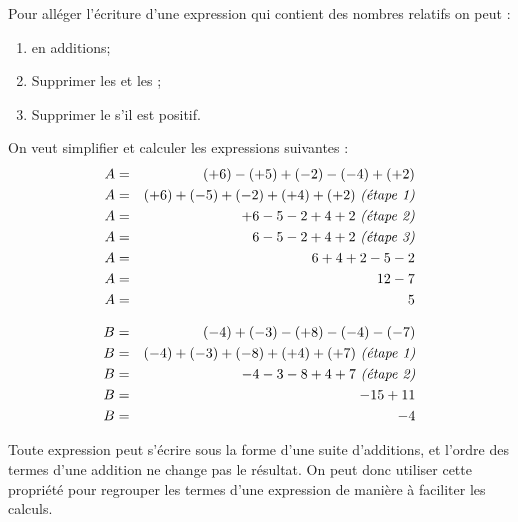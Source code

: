 \begin{mymeth}
	Pour alléger l'écriture d'une expression qui contient des nombres relatifs on peut :
	\begin{enumerate}
		\item {} en additions;
		\item Supprimer les  et les ;
		\item Supprimer le  s'il est positif.
	\end{enumerate}
\end{mymeth}

\begin{myexs}
	
	On veut simplifier et calculer les expressions suivantes :
	\begin{eqnarray*}
		A &=& (+6) - (+5) + (-2) - (-4) + (+2)\\
		A &=& (+6) + (-5) + (-2) + (+4) + (+2)  \text{  \textit{(étape 1)}} \\
		A &=& +6  -5  -2  +4  +2 \text{  \textit{(étape 2)}}\\
		A &=& 6  -5  -2  +4  +2 \text{  \textit{(étape 3)}}\\
		A &=& 6 + 4 + 2 - 5 - 2 \\
		A &=& 12 - 7 \\
		A &=& 5 \\
	\end{eqnarray*}


	\begin{eqnarray*}
		B &=& (-4) + (-3) - (+8) - (-4) - (-7)\\
		B &=& (-4) + (-3) + (-8) + (+4) + (+7) \text{  \textit{(étape 1)}}\\
		B &=& -4  -3  -8  +4  +7 \text{  \textit{(étape 2)}}\\
		B &=& -15 + 11 \\
		B &=& -4 \\
	\end{eqnarray*}
\end{myexs}

\newpage

\begin{myrem}
	Toute expression peut s'écrire sous la forme d'une suite d'additions, et l'ordre des termes d'une addition ne change pas le résultat. On peut donc utiliser cette propriété pour regrouper les termes d'une expression de manière à faciliter les calculs.
\end{myrem}

